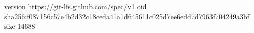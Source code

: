 version https://git-lfs.github.com/spec/v1
oid sha256:f087156c57e4b2d32c18ceda41a1d645611c025d7ee6edd7d7963f704249a3bf
size 14688
